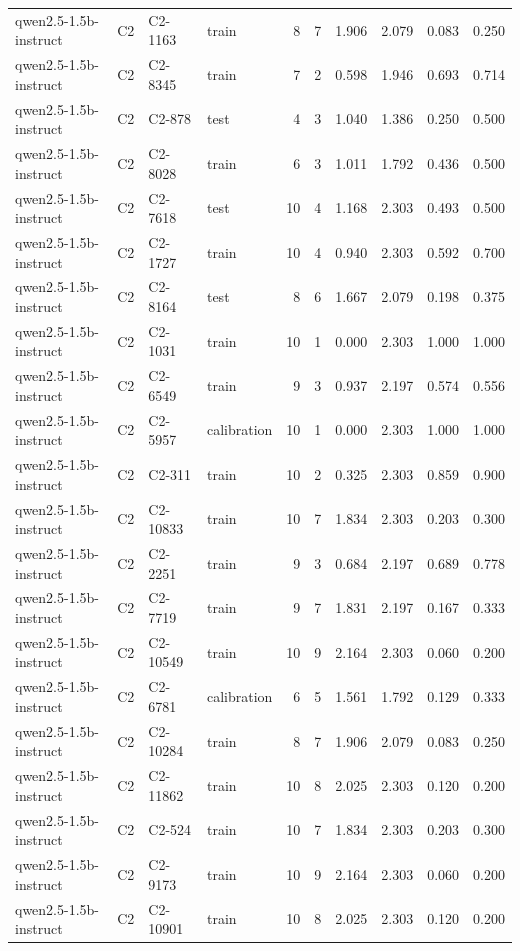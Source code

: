 \begin{table}
\begin{tabular}{llllrrrrrr}
qwen2.5-1.5b-instruct & C2 & C2-1163 & train & 8 & 7 & 1.906 & 2.079 & 0.083 & 0.250 \\
qwen2.5-1.5b-instruct & C2 & C2-8345 & train & 7 & 2 & 0.598 & 1.946 & 0.693 & 0.714 \\
qwen2.5-1.5b-instruct & C2 & C2-878 & test & 4 & 3 & 1.040 & 1.386 & 0.250 & 0.500 \\
qwen2.5-1.5b-instruct & C2 & C2-8028 & train & 6 & 3 & 1.011 & 1.792 & 0.436 & 0.500 \\
qwen2.5-1.5b-instruct & C2 & C2-7618 & test & 10 & 4 & 1.168 & 2.303 & 0.493 & 0.500 \\
qwen2.5-1.5b-instruct & C2 & C2-1727 & train & 10 & 4 & 0.940 & 2.303 & 0.592 & 0.700 \\
qwen2.5-1.5b-instruct & C2 & C2-8164 & test & 8 & 6 & 1.667 & 2.079 & 0.198 & 0.375 \\
qwen2.5-1.5b-instruct & C2 & C2-1031 & train & 10 & 1 & 0.000 & 2.303 & 1.000 & 1.000 \\
qwen2.5-1.5b-instruct & C2 & C2-6549 & train & 9 & 3 & 0.937 & 2.197 & 0.574 & 0.556 \\
qwen2.5-1.5b-instruct & C2 & C2-5957 & calibration & 10 & 1 & 0.000 & 2.303 & 1.000 & 1.000 \\
qwen2.5-1.5b-instruct & C2 & C2-311 & train & 10 & 2 & 0.325 & 2.303 & 0.859 & 0.900 \\
qwen2.5-1.5b-instruct & C2 & C2-10833 & train & 10 & 7 & 1.834 & 2.303 & 0.203 & 0.300 \\
qwen2.5-1.5b-instruct & C2 & C2-2251 & train & 9 & 3 & 0.684 & 2.197 & 0.689 & 0.778 \\
qwen2.5-1.5b-instruct & C2 & C2-7719 & train & 9 & 7 & 1.831 & 2.197 & 0.167 & 0.333 \\
qwen2.5-1.5b-instruct & C2 & C2-10549 & train & 10 & 9 & 2.164 & 2.303 & 0.060 & 0.200 \\
qwen2.5-1.5b-instruct & C2 & C2-6781 & calibration & 6 & 5 & 1.561 & 1.792 & 0.129 & 0.333 \\
qwen2.5-1.5b-instruct & C2 & C2-10284 & train & 8 & 7 & 1.906 & 2.079 & 0.083 & 0.250 \\
qwen2.5-1.5b-instruct & C2 & C2-11862 & train & 10 & 8 & 2.025 & 2.303 & 0.120 & 0.200 \\
qwen2.5-1.5b-instruct & C2 & C2-524 & train & 10 & 7 & 1.834 & 2.303 & 0.203 & 0.300 \\
qwen2.5-1.5b-instruct & C2 & C2-9173 & train & 10 & 9 & 2.164 & 2.303 & 0.060 & 0.200 \\
qwen2.5-1.5b-instruct & C2 & C2-10901 & train & 10 & 8 & 2.025 & 2.303 & 0.120 & 0.200 \\

\end{tabular}
\end{table}
